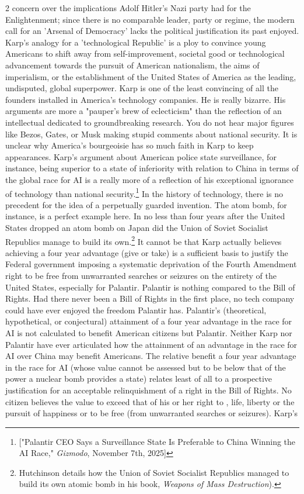 \documentclass[10pt,a4paper,twoside]{article} %
\begin{document}
\begin{multicols}{2}
concern over the implications Adolf Hitler's Nazi party had for the Enlightenment; since there is no comparable leader, party or regime, the modern call for an 'Arsenal of Democracy' lacks the political justification its past enjoyed.  Karp's analogy for a 'technological Republic' is a ploy to convince young Americans to shift away from self-improvement, societal good or technological advancement towards the pursuit of American nationalism, the aims of imperialism, or the establishment of the United States of America as the leading, undisputed, global superpower. \newline \indent Karp is one of the least convincing of all the founders installed in America's technology companies. He is really bizarre. His arguments are more a "pauper's brew of eclecticism" than the reflection of an intellectual dedicated to groundbreaking research. You do not hear major figures like Bezos, Gates, or Musk making stupid comments about national security. It is unclear why America’s bourgeoisie has so much faith in Karp to keep appearances.  Karp's argument about American police state surveillance, for instance, being superior to a state of inferiority with relation to China in terms of the global race for AI is a really more of a reflection of his exceptional ignorance of technology than national security.\footnote{["Palantir CEO Says a Surveillance State Is Preferable to China Winning the AI Race," \emph{Gizmodo}, November 7th, 2025]} In the history of technology, there is no precedent for the idea of a perpetually guarded invention. The atom bomb, for instance, is a perfect example here. In no less than four years after the United States dropped an atom bomb on Japan did the Union of Soviet Socialist Republics manage to build its own.\footnote{Hutchinson details how the Union of Soviet Socialist Republics managed to build its own atomic bomb in his book, \emph{Weapons of Mass Destruction}).} It cannot be that Karp actually believes achieving a four year advantage (give or take) is a sufficient basis to justify the Federal government imposing a systematic deprivation of the Fourth Amendment right to be free from unwarranted searches or seizures on the entirety of the United States, especially for Palantir. Palantir is nothing compared to the Bill of Rights. Had there never been a Bill of Rights in the first place, no tech company could have ever enjoyed the freedom Palantir has. Palantir's (theoretical, hypothetical, or conjectural) attainment of a four year advantage in the race for AI is not calculated to benefit American citizens but Palantir. Neither Karp nor Palantir have ever articulated how the attainment of an advantage in the race for AI over China may benefit Americans. The relative benefit a four year advantage in the race for AI (whose value cannot be assessed but to be below that of the power a nuclear bomb provides a state) relates least of all to a prospective justification for an acceptable relinquishment of a right in the Bill of Rights. No citizen believes the value to exceed that of his or her right to , life, liberty or the pursuit of happiness or to be free (from unwarranted searches or seizures). \newline \indent Karp's 
\end{multicols}
\end{document}
